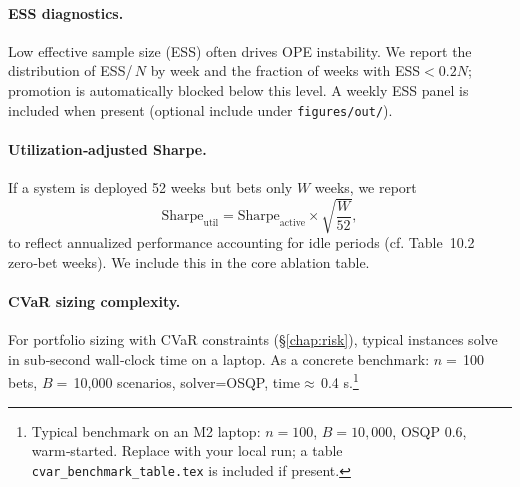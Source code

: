 \paragraph{ESS diagnostics.} Low effective sample size (ESS) often drives OPE instability. We report the distribution of ESS/\,$N$ by week and the fraction of weeks with ESS$<0.2N$; promotion is automatically blocked below this level. A weekly ESS panel is included when present (optional include under \texttt{figures/out/}).


\paragraph{Utilization‑adjusted Sharpe.} If a system is deployed 52 weeks but bets only $W$ weeks, we report
\[\mathrm{Sharpe}_{\mathrm{util}} = \mathrm{Sharpe}_{\mathrm{active}}\times\sqrt{\frac{W}{52}},\]
to reflect annualized performance accounting for idle periods (cf. Table~10.2 zero‑bet weeks). We include this in the core ablation table.

\paragraph{CVaR sizing complexity.} For portfolio sizing with CVaR constraints (\S\ref{chap:risk}), typical instances solve in sub‑second wall‑clock time on a laptop. As a concrete benchmark: $n=\,$100 bets, $B=\,$10{,}000 scenarios, solver=OSQP, time$\approx\,$0.4 s.\footnote{Typical benchmark on an M2 laptop: $n=100$, $B=10{,}000$, OSQP 0.6, warm‑started. Replace with your local run; a table \texttt{cvar\_benchmark\_table.tex} is included if present.}

